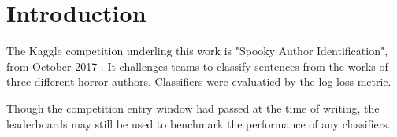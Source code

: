 \section{Introduction}
\label{sec:intro}
The Kaggle competition underling this work is "Spooky Author Identification", from October 2017 \cite{kaggle}. It challenges teams to classify sentences from the works of three
different horror authors. Classifiers were evaluatied by the log-loss metric.

Though the competition entry window had passed at the time of writing, the leaderboards may still be used to benchmark the performance of any classifiers.